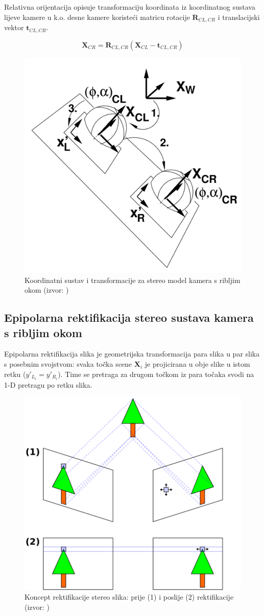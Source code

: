 \documentclass[../seminar.tex]{subfiles}
\begin{document}
\hfill\break
\hfill\break
\hfill\break
\indent Relativna orijentacija opisuje transformaciju koordinata iz koordinatnog sustava lijeve kamere u k.o. desne kamere koristeći matricu rotacije $\boldsymbol{R}_{CL,CR}$ i translacijski vektor $\boldsymbol{t}_{CL,CR}$.

\begin{equation}
\label{eq:eq_ext_ori1}
\boldsymbol{X}_{CR} = \boldsymbol{R}_{CL,CR}(\boldsymbol{X}_{CL} - \boldsymbol{t}_{CL,CR})
\end{equation}

\begin{figure}[ht!]
  \centering
    \includegraphics[width=.5\textwidth]{exterior_orientation.png}
   \caption{Koordinatni sustav i transformacije za stereo model kamera s ribljim okom (izvor: \cite{Abraham})}
  \label{fig:exterior_orientation}
\end{figure}


\subsection{Epipolarna rektifikacija stereo sustava kamera s ribljim okom}


Epipolarna rektifikacija slika je geometrijska transformacija para slika u par slika s posebnim svojstvom: svaka točka scene $\boldsymbol{X}_i$ je projicirana u obje slike u istom retku ($y'_{L_i} = y'_{R_i}$). Time se pretraga za drugom točkom iz para točaka svodi na 1-D pretragu po retku slika.

\begin{figure}[ht!]
  \centering
    \includegraphics[width=.5\textwidth]{img_007_rectification01.png}
   \caption{Koncept rektifikacije stereo slika: prije (1) i poslije (2) rektifikacije (izvor: \cite{Wikipedia:Rectification})}
  \label{fig:rectification_idea}
\end{figure}
\end{document}
